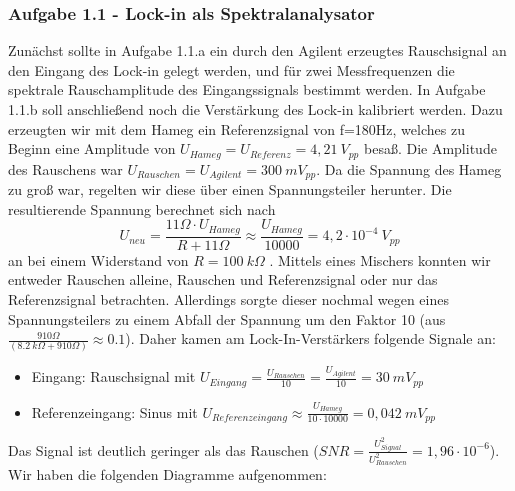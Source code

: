 \documentclass{scrartcl}						%
\begin{document}
			\subsubsection{Aufgabe 1.1 - Lock-in als Spektralanalysator}
			Zunächst sollte in Aufgabe 1.1.a ein durch den Agilent erzeugtes Rauschsignal an den Eingang des Lock-in gelegt werden, und für zwei Messfrequenzen die spektrale Rauschamplitude des Eingangssignals bestimmt werden. In Aufgabe 1.1.b soll anschließend noch die Verstärkung des Lock-in kalibriert werden. Dazu erzeugten wir mit dem Hameg ein Referenzsignal von f=180Hz, welches zu Beginn eine Amplitude von $ U_{Hameg}=U_{Referenz}=4,21 \ V_{pp} $ besaß. Die Amplitude des Rauschens war $ U_{Rauschen}=U_{Agilent}=300 \ mV_{pp} $. Da die Spannung des Hameg zu groß war, regelten wir diese über einen Spannungsteiler herunter. Die resultierende Spannung berechnet sich nach 
			\begin{equation*}
					U_{neu}=\frac{11\Omega \cdot U_{Hameg}}{R+11\Omega} \approx \frac{U_{Hameg}}{10000} =4,2\cdot 10^{-4} \ V_{pp} 
			\end{equation*}
			an bei einem Widerstand von $ R=100 \ k\Omega$ .
			Mittels eines Mischers konnten wir entweder Rauschen alleine, Rauschen und Referenzsignal oder nur das Referenzsignal betrachten. Allerdings sorgte dieser nochmal wegen eines Spannungsteilers zu einem Abfall der Spannung um den Faktor 10 (aus $ \frac{910 \Omega}{(8.2 \ k\Omega +910\Omega)} \approx 0.1$). Daher kamen am Lock-In-Verstärkers folgende Signale an:
			\begin{itemize}
			\item Eingang: Rauschsignal mit $ U_{Eingang}=\frac{U_{Rauschen}}{10}=\frac{U_{Agilent}}{10}=30 \ mV_{pp}$
			\item Referenzeingang: Sinus mit $ U_{Referenzeingang}\approx \frac{U_{Hameg}}{10 \cdot 10000 }= 0,042 \ mV_{pp}$
			\end{itemize} 
			Das Signal ist deutlich geringer als das Rauschen ($ SNR=\frac{U_{Signal}^2}{U_{Rauschen}^2}=1,96\cdot 10^{-6} $).\newline
			Wir haben die folgenden Diagramme aufgenommen:
\end{document}

